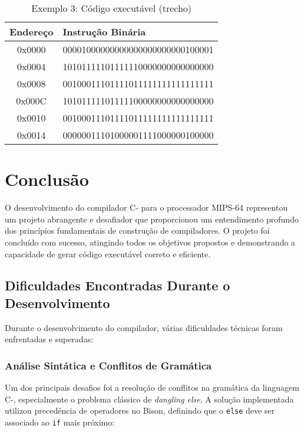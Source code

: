 \documentclass[
	12pt,				%
	oneside,
	a4paper,			%
	english,			%
	french,				%
	spanish,			%
	brazil,				%
	]{abntex2}
\begin{document}
\begin{table}[H]
\centering
\caption{Exemplo 3: Código executável (trecho)}
\begin{tabular}{|c|l|}
\hline
\textbf{Endereço} & \textbf{Instrução Binária} \\
\hline
0x0000 & 00001000000000000000000000100001 \\
\hline
0x0004 & 10101111101111110000000000000000 \\
\hline
0x0008 & 00100011101111011111111111111111 \\
\hline
0x000C & 10101111101111100000000000000000 \\
\hline
0x0010 & 00100011101111011111111111111111 \\
\hline
0x0014 & 00000011101000001111000000100000 \\
\hline
\end{tabular}
\end{table}

\chapter{Conclusão}

O desenvolvimento do compilador C- para o processador MIPS-64 representou um projeto abrangente e desafiador que proporcionou um entendimento profundo dos princípios fundamentais de construção de compiladores. O projeto foi concluído com sucesso, atingindo todos os objetivos propostos e demonstrando a capacidade de gerar código executável correto e eficiente.

\section{Dificuldades Encontradas Durante o Desenvolvimento}

Durante o desenvolvimento do compilador, várias dificuldades técnicas foram enfrentadas e superadas:

\subsection{Análise Sintática e Conflitos de Gramática}

Um dos principais desafios foi a resolução de conflitos na gramática da linguagem C-, especialmente o problema clássico de \textit{dangling else}. A solução implementada utilizou precedência de operadores no Bison, definindo que o \texttt{else} deve ser associado ao \texttt{if} mais próximo:
\end{document}
